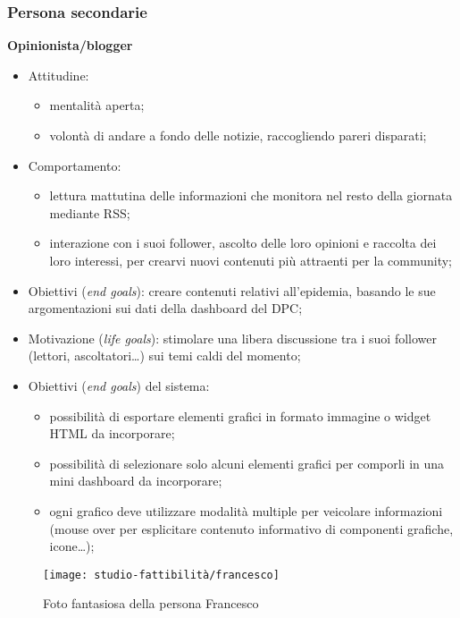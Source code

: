 \subsubsection*{Persona secondarie}
\textbf{Opinionista/blogger}
\begin{itemize}
    \item Attitudine:
    \begin{itemize}
        \item mentalità aperta;
        \item volontà di andare a fondo delle notizie, raccogliendo pareri disparati;
    \end{itemize}
    \item Comportamento: 
    \begin{itemize}
        \item lettura mattutina delle informazioni che monitora nel resto della giornata mediante RSS;
        \item interazione con i suoi follower, ascolto delle loro opinioni e raccolta dei loro interessi, per crearvi nuovi contenuti più attraenti per la community;
    \end{itemize}
    \item Obiettivi (\textit{end goals}): creare contenuti relativi all'epidemia, basando le sue argomentazioni sui dati della dashboard del DPC;
    \item Motivazione (\textit{life goals}): stimolare una libera discussione tra i suoi follower (lettori, ascoltatori…) sui temi caldi del momento;
    \item Obiettivi (\textit{end goals}) del sistema:
    \begin{itemize}
        \item possibilità di esportare elementi grafici in formato immagine o widget HTML da incorporare;
        \item possibilità di selezionare solo alcuni elementi grafici per comporli in una mini dashboard da incorporare; 
        \item ogni grafico deve utilizzare modalità multiple per veicolare informazioni (mouse over per esplicitare contenuto informativo di componenti grafiche, icone…); 
    \end{itemize}
\end{itemize}

\begin{wrapfigure}{l}{7cm}
    \texttt{[image: studio-fattibilità/francesco]}
    \caption{Foto fantasiosa della persona Francesco}
\end{wrapfigure}

